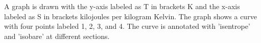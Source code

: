 A graph is drawn with the y-axis labeled as T in brackets K and the x-axis labeled as S in brackets kilojoules per kilogram Kelvin. The graph shows a curve with four points labeled 1, 2, 3, and 4. The curve is annotated with 'isentrope' and 'isobare' at different sections.